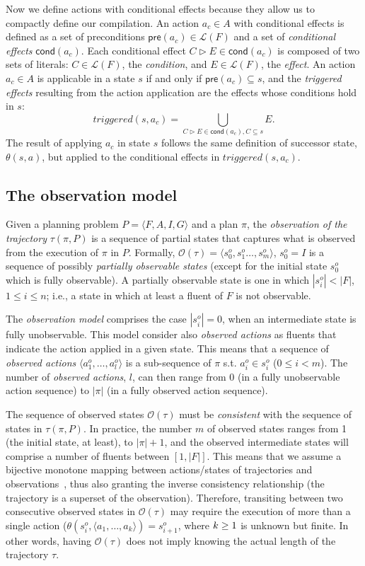 \documentclass[runningheads]{llncs}
\newcommand{\tup}[1]{{\langle #1 \rangle}}
\newcommand{\pre}{\mathsf{pre}}     %
\newcommand{\cond}{\mathsf{cond}}   %
\begin{document}
Now we define actions with conditional effects because they allow us to compactly define our compilation. An action $a_c\in A$ with conditional effects is defined as a set of preconditions $\pre(a_c)\in\mathcal{L}(F)$ and a set of {\em conditional effects} $\cond(a_c)$. Each conditional effect $C\rhd E\in\cond(a_c)$ is composed of two sets of literals: $C\in\mathcal{L}(F)$, the {\em condition}, and $E\in\mathcal{L}(F)$, the {\em effect}. An action $a_c\in A$ is applicable in a state $s$ if and only if $\pre(a_c)\subseteq s$, and the {\em triggered effects} resulting from the action application are the effects whose conditions hold in $s$:
\[
triggered(s,a_c)=\bigcup\limits_{C\rhd E\in\cond(a_c),C\subseteq s} E. 
\]
The result of applying $a_c$ in state $s$ follows the same definition of successor state, $\theta(s,a)$, but applied to the conditional effects in $triggered(s,a_c)$.

\subsection{The observation model}
Given a planning problem $P=\tup{F,A,I,G}$ and a plan $\pi$, the \emph{observation of the trajectory} $\tau(\pi,P)$ is a sequence of partial states that captures what is observed from the execution of $\pi$ in $P$. Formally, $\mathcal{O}(\tau)=\tup{s_0^o,s_1^o \ldots , s_m^o}$, $s_0^o=I$ is a sequence of possibly {\em partially observable states} (except for the initial state $s_0^o$ which is fully observable). A partially observable state is one in which $|s_i^o| < |F|$, {\small $1\leq i\leq n$}; i.e., a state in which at least a fluent of $F$ is not observable.

The {\em observation model} comprises the case $|s_i^o| = 0$, when an intermediate state is fully unobservable. This model consider also {\em observed actions} as fluents that indicate the action applied in a given state. This means that a sequence of {\em observed actions} $\tup{a_1^o, \ldots, a_l^o}$ is a sub-sequence of $\pi$ s.t. $a_i^o\in s_i^o$ ({\small $0\leq i <m$}).  The number of {\em observed actions}, $l$, can then range from $0$ (in a fully unobservable action sequence) to $|\pi|$ (in a fully observed action sequence).

The sequence of observed states $\mathcal{O}(\tau)$ must be {\em consistent} with the sequence of states in $\tau(\pi,P)$. In practice, the number $m$ of observed states ranges from 1 (the initial state, at least), to $|\pi|+1$, and the observed intermediate states will comprise a number of fluents between $[1,|F|]$.  This means that we assume a bijective monotone mapping between actions/states of trajectories and observations~\cite{ramirez2009plan}, thus also granting the inverse consistency relationship (the trajectory is a superset of the observation). Therefore, transiting between two consecutive observed states in $\mathcal{O}(\tau)$ may require the execution of more than a single action ($\theta(s_i^o,\tup{a_1,\ldots,a_k})=s_{i+1}^o$, where ${\small k\geq 1}$ is unknown but finite. In other words, having $\mathcal{O}(\tau)$ does not imply knowing the actual length of the trajectory $\tau$.
\end{document}
